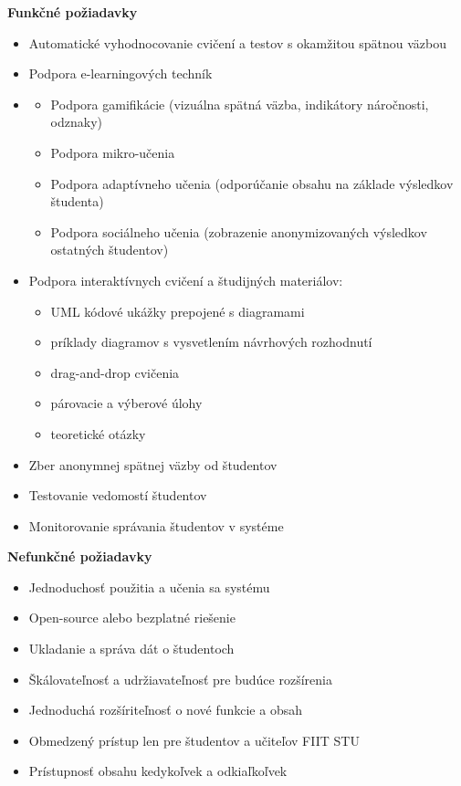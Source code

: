 \textbf{Funkčné požiadavky}
\begin{itemize}
    \item Automatické vyhodnocovanie cvičení a testov s okamžitou spätnou väzbou
    \item Podpora e-learningových techník
    \item 
    \begin{itemize}
        \item Podpora gamifikácie (vizuálna spätná väzba, indikátory náročnosti, odznaky)
        \item Podpora mikro-učenia
        \item Podpora adaptívneho učenia (odporúčanie obsahu na základe výsledkov študenta)
        \item Podpora sociálneho učenia (zobrazenie anonymizovaných výsledkov ostatných študentov)
    \end{itemize}   
    \item Podpora interaktívnych cvičení a študijných materiálov:
    \begin{itemize}
        \item UML kódové ukážky prepojené s diagramami
        \item príklady diagramov s vysvetlením návrhových rozhodnutí
        \item drag-and-drop cvičenia
        \item párovacie a výberové úlohy
        \item teoretické otázky
    \end{itemize}
    \item Zber anonymnej spätnej väzby od študentov
    \item Testovanie vedomostí študentov
    \item Monitorovanie správania študentov v systéme
\end{itemize}

\textbf{Nefunkčné požiadavky}
\begin{itemize}
    \item Jednoduchosť použitia a učenia sa systému
    \item Open-source alebo bezplatné riešenie
    \item Ukladanie a správa dát o študentoch
    \item Škálovateľnosť a udržiavateľnosť pre budúce rozšírenia
    \item Jednoduchá rozšíriteľnosť o nové funkcie a obsah
    \item Obmedzený prístup len pre študentov a učiteľov FIIT STU
    \item Prístupnosť obsahu kedykoľvek a odkiaľkoľvek
\end{itemize}

